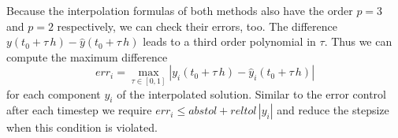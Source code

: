 \documentclass{juliacon}
\begin{document}
\begin{table}
 \label{tab:coeff}
\end{table}

Because the interpolation formulas of both methods also have the order $p=3$ and $p=2$ respectively, we can check their errors, too. 
The difference $y(t_0+ \tau \, h) - \hat y(t_0 + \tau \, h)$ leads to a third order polynomial in $\tau$. Thus we can compute the maximum difference 
\[err_i = \max_{\tau \in [0,1]}|y_i(t_0+ \tau \, h) - \hat y_i(t_0 + \tau \, h)|\]
 for each component $y_i$ of the interpolated solution. Similar to the error control after each timestep we require 
 $err_i \leq abstol + reltol \,|y_i|$ and reduce the stepsize when this condition is violated.
 
\end{document}
